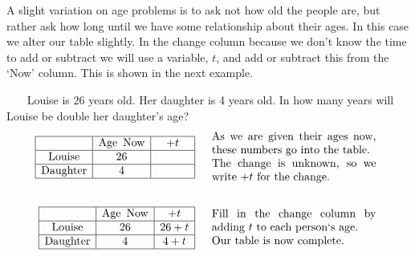  A slight variation on age problems is to ask not how old the people are, but
rather ask how long until we have some relationship about their ages. In this
case we alter our table slightly. In the change column because we don't know
the time to add or subtract we will use a variable, $t$, and add or subtract
this from the `Now' column. This is shown in the next example.\pp

\begin{example}\label{Lin85}~~~ Louise is 26 years old. Her daughter is 4 years old. In how many years will
  Louise be double her daughter's age?
  \begin{eqnarray*}
    \begin{array}{|c|c|c|}
      \hline
      & \tmop{Age~} \tmop{Now} & + t\\
      \hline
      \tmop{Louise} & 26 & \mbox{\hspace{.4in}}\\
      \hline
      \tmop{Daughter} & 4 & \\
      \hline
    \end{array} &  & \begin{array}{p{0.425\textwidth}}
      \tmop{As} \tmop{we} \tmop{are} \tmop{given} \tmop{their} \tmop{ages}
      \tmop{now}, \tmop{these} \tmop{numbers} \tmop{go} \tmop{into}
      \tmop{the} \tmop{table}.\\
			\tmop{The} \tmop{change} \tmop{is} \tmop{unknown}, \tmop{so} \tmop{we} \tmop{write} $+ t$ \tmop{for} \tmop{the} \tmop{change}.
    \end{array}\\
    &  & \\
    \begin{array}{|c|c|c|}
      \hline
      & \tmop{Age~} \tmop{Now} & + t\\
      \hline
      \tmop{Louise} & 26 & 26 + t\\
      \hline
      \tmop{Daughter} & 4 & 4 + t\\
      \hline
    \end{array} &  & \begin{array}{p{0.425\textwidth}}
      \tmop{Fill} \tmop{in} \tmop{the} \tmop{change} \tmop{column} \tmop{by}
      \tmop{adding} $t$ \tmop{to} \tmop{each} \tmop{person`s} \tmop{age}.\\ \tmop{Our} \tmop{table} \tmop{is} \tmop{now} \tmop{complete}.
    \end{array}\\
    &  & \\
\end{eqnarray*}

\end{example}
